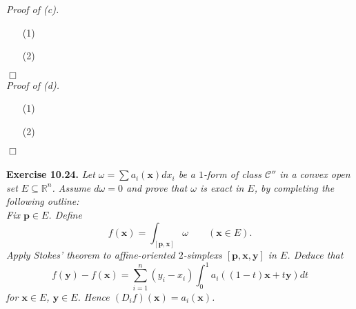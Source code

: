 \documentclass{article}
\begin{document}
\emph{Proof of (c).}
\begin{enumerate}
\item[(1)]
\item[(2)]

\end{enumerate}
$\Box$ \\



\emph{Proof of (d).}
\begin{enumerate}
\item[(1)]
\item[(2)]

\end{enumerate}
$\Box$ \\\\






\textbf{Exercise 10.24.}
\emph{Let $\omega = \sum a_i(\mathbf{x}) dx_i$ be a $1$-form of class $\mathscr{C}''$
in a convex open set $E \subseteq \mathbb{R}^n$.
Assume $d\omega = 0$ and prove that $\omega$ is exact in $E$,
by completing the following outline:} \\

\emph{Fix $\mathbf{p} \in E$.
Define
\[
  f(\mathbf{x}) = \int_{[\mathbf{p},\mathbf{x}]} \omega
  \qquad
  (\mathbf{x} \in E).
\]
Apply Stokes' theorem to affine-oriented $2$-simplexs $[\mathbf{p},\mathbf{x},\mathbf{y}]$ in $E$.
Deduce that
\[
  f(\mathbf{y}) - f(\mathbf{x})
  = \sum_{i=1}^{n}(y_i - x_i) \int_{0}^{1} a_i((1-t)\mathbf{x} + t\mathbf{y}) dt
\]
for $\mathbf{x} \in E$, $\mathbf{y} \in E$.
Hence $(D_i f)(\mathbf{x}) = a_i(\mathbf{x})$.} \\
\end{document}
